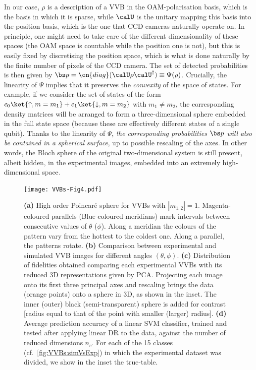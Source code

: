 In our case, $\rho$ is a description of a VVB in the OAM-polarisation basis, which is the basis in which it is sparse, while $\calU$ is the unitary mapping this basis into the position basis, which is the one that CCD cameras naturally operate on. In principle, one might need to take care of the different dimensionality of these spaces (the OAM space is countable while the position one is not), but this is easily fixed by discretising the position space, which is what is done naturally by the finite number of pixels of the CCD camera. 
The set of detected probabilities is then given by $\bs p=\on{diag}(\calU\rho\calU^\dagger)\equiv\Psi(\rho)$.
Crucially, the linearity of $\Psi$ implies that it preserves the \emph{convexity} of the space of states.
For example, if we consider the set of states of the form $c_0 \ket{\uparrow,m=m_1} + c_1 \ket{\downarrow,m=m_2}$ with $m_1\neq m_2$, the corresponding density matrices will be arranged to form a three-dimensional sphere embedded in the full state space (because these are effectively different states of a single qubit).
Thanks to the linearity of $\Psi$, \emph{the corresponding probabilities $\bs p$ will also be contained in a spherical surface}, up to possible rescaling of the axes.
In other words, the Bloch sphere of the original two-dimensional system is still present, albeit hidden, in the experimental images, embedded into an extremely high-dimensional space.


\begin{figure}[tb]
    \centering
    \texttt{[image: VVBs-Fig4.pdf]}
    \caption{
		\textbf{(a)}
		High order Poincaré sphere for \acp{VVB} with $|m_{1,2}|=1$. Magenta-coloured parallels (Blue-coloured meridians) mark intervals between consecutive values of $\theta$ ($\phi$). 
		Along a meridian the colours of the pattern vary from the hottest to the coldest one. Along a parallel, the patterns rotate.
		\textbf{(b)}
		Comparison between experimental and simulated \ac{VVB} images for different angles $(\theta, \phi)$.
		\textbf{(c)}
		Distribution of fidelities obtained comparing each experimental VVBs with its reduced 3D representations given by PCA. Projecting each image onto its first three principal axes and rescaling brings the data (orange points) onto a sphere in 3D, as shown in the inset. The inner (outer) black (semi-transparent) sphere is added for contrast [radius equal to that of the point with smaller (larger) radius].
		\textbf{(d)}
		Average prediction accuracy of a linear \ac{SVM} classifier, trained and tested after applying linear DR to the data, against the number of reduced dimensions $n_c$.
		For each of the 15 classes (cf.~\cref{fig:VVBs:simVsExp}) in which the experimental dataset was divided, we show in the inset the true-table. 
    }%
    \label{fig:VVBs:PCAresults}
\end{figure}


